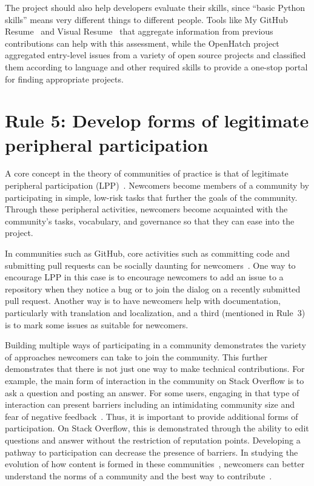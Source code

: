\documentclass[10pt,letterpaper]{article}
\newcommand{\rulemajor}[1]{\section*{#1}}
\begin{document}
The project should also help developers evaluate their skills,
since ``basic Python skills'' means very different things to different people.
Tools like My GitHub Resume~\cite{my-github-resume} and Visual Resume~\cite{sarma2016}
that aggregate information from previous contributions can help with this assessment,
while the OpenHatch project~\cite{openhatch} aggregated entry-level issues from a variety of open source projects
and classified them according to language and other required skills
to provide a one-stop portal for finding appropriate projects.

\rulemajor{Rule 5: Develop forms of legitimate peripheral participation}

A core concept in the theory of communities of practice is that of
legitimate peripheral participation (LPP)~\cite{lave1991,wenger1999}.
Newcomers become members of a community by participating in simple, low-risk tasks
that further the goals of the community.
Through these peripheral activities,
newcomers become acquainted with the community's tasks, vocabulary, and governance
so that they can ease into the project.

In communities such as GitHub,
core activities such as committing code and submitting pull requests can be socially daunting for newcomers~\cite{steinmacher2015}.
One way to encourage LPP in this case is to encourage newcomers to add an issue to a repository when they notice a bug
or to join the dialog on a recently submitted pull request.
Another way is to have newcomers help with documentation,
particularly with translation and localization,
and a third (mentioned in Rule~3) is to mark some issues as suitable for newcomers.

Building multiple ways of participating in a community demonstrates the variety of approaches newcomers can take to join the community.
This further demonstrates that there is not just one way to make technical contributions.
For example,
the main form of interaction in the community on Stack Overflow is to ask a question and posting an answer.
For some users,
engaging in that type of interaction can present barriers including an intimidating community size and fear of negative feedback~\cite{ford2016}.
Thus, it is important to provide additional forms of participation.
On Stack Overflow, this is demonstrated through the ability to edit questions and answer without the restriction of reputation points.
Developing a pathway to participation can decrease the presence of barriers.
In studying the evolution of how content is formed in these communities~\cite{baltes2018},
newcomers can better understand the norms of a community and the best way to contribute~\cite{ford2018}.
\end{document}
